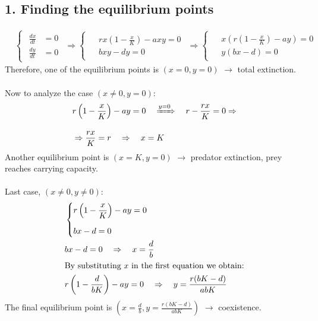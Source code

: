 \documentclass{article}
\begin{document}
	\subsection*{1. Finding the equilibrium points}
	\begin{align}
		&\begin{cases}
			\begin{aligned}
				\frac{dx}{dt} &= 0 \\[1em]
				\frac{dy}{dt} &= 0
			\end{aligned}
		\end{cases}
		\Rightarrow
		\begin{cases}
			\begin{aligned}
				&rx \left(1 - \frac{x}{K} \right) - axy = 0 \\[1em]
				&bxy - dy = 0
			\end{aligned}
		\end{cases}
		\Rightarrow
		\begin{cases}
			\begin{aligned} 
				&x \left(r \left(1 - \frac{x}{K} \right) - ay \right) = 0 \\[1em]
				&y \left(bx - d \right) = 0
			\end{aligned}
		\end{cases}
	\end{align}
	Therefore, one of the equilibrium points is $(x=0, y=0)$ $\rightarrow$ total extinction. \\ \\
	Now to analyze the case $(x \neq 0, y = 0)$: \\
	\begin{align}
			\begin{aligned} 
				&r \left(1 - \frac{x}{K} \right) - ay = 0 \quad \xRightarrow{y = 0}  \quad r - \frac{rx}{K} = 0 \Rightarrow \\[1em] 
				&\Rightarrow \frac{rx}{K} = r \quad \Rightarrow \quad x = K
			\end{aligned}
	\end{align}
	Another equilibrium point is $(x=K, y=0)$ $\rightarrow$ predator extinction, prey reaches carrying capacity. \\ \\
	Last case, $(x \neq 0, y \neq 0)$: \\
	\begin{align}
		&\begin{cases}
			\begin{aligned}
				&r \left(1 - \frac{x}{K} \right) - ay = 0 \\[1em]
				&bx - d = 0
			\end{aligned}
		\end{cases} \\
		&bx - d = 0 \quad \Rightarrow \quad x = \frac{d}{b} \\ 
		\intertext{By substituting $x$ in the first equation we obtain:}
		&r \left(1 - \frac{d}{bK} \right) - ay = 0 \quad \Rightarrow \quad y = \frac{r(bK - d)}{abK}
	\end{align}
	The final equilibrium point is $(x = \frac{d}{b}, y = \frac{r(bK - d)}{abK})$ $\rightarrow$ coexistence.
	
\end{document}
